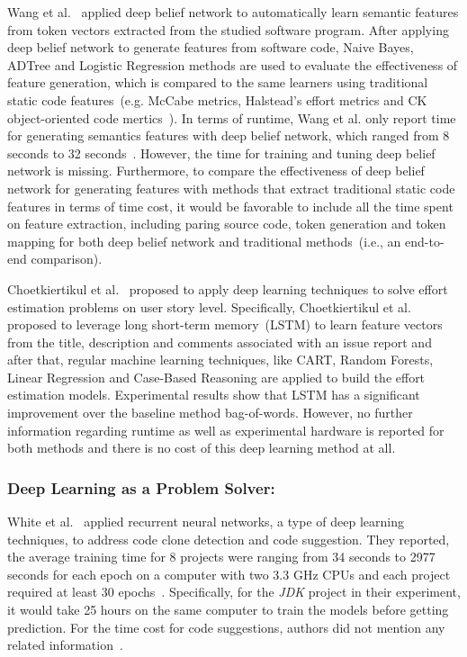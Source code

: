 \documentclass[sigconf]{acmart}
\theoremstyle{break}
\begin{document}
 Wang et al.~\cite{wang2016automatically} applied deep belief network to automatically
 learn semantic features from token vectors extracted from the studied software program. After
 applying deep belief network to generate features from software code,
 Naive Bayes, ADTree and Logistic Regression methods are used to evaluate the effectiveness
 of feature generation, which is compared to the same learners using traditional 
 static code features~(e.g.  McCabe metrics, Halstead's effort metrics and  CK object-oriented code mertics~\cite{kafura1987use,chidamber1994metrics,mccabe1976complexity,halstead1977elements}). In terms of
 runtime, Wang et al. only report time for generating semantics features with deep belief network, which
 ranged from 8 seconds to 32 seconds~\cite{wang2016automatically}. However, the time for training and tuning deep belief network is
 missing. Furthermore, to compare the effectiveness of deep belief network for generating features with methods that extract traditional 
 static code features in terms of time cost, 
 it would be favorable to include all the time spent on feature extraction, including
 paring source code, token generation and token mapping for both deep belief network and traditional methods~(i.e., an end-to-end comparison).
 
 Choetkiertikul et al.~\cite{choetkiertikul2016deep} proposed to apply deep learning techniques
 to solve effort estimation problems on user story level. 
 Specifically,  Choetkiertikul et al. ~\cite{choetkiertikul2016deep} proposed to leverage
 long short-term memory~(LSTM) to learn feature vectors from the title,
 description and comments associated with an issue report and after that,
 regular machine learning techniques, like CART, Random Forests, 
 Linear Regression and Case-Based Reasoning are applied to build the effort
 estimation models. Experimental results show that
 LSTM has a 
 significant improvement over the baseline method bag-of-words.
 However, no further information regarding
 runtime as well as experimental hardware  is reported for both methods and there is no cost 
 of this deep learning method at all.
 
 
\noindent
\subsubsection{Deep Learning as  a Problem Solver:}

 White et al.~\cite{white2015toward, white2016deep} applied
 recurrent neural networks, a type of  deep learning techniques, 
 to address code clone detection and code suggestion. They reported,
 the average training time for 8 projects were ranging from 34 seconds
  to 2977 seconds for each epoch on a computer with two 3.3 GHz
 CPUs and each project required at least 30 epochs~\cite{white2016deep}.
Specifically, for the {\it JDK} project in their experiment, it would take 25 hours 
 on the same computer to train the models before getting prediction.
 For the time cost for code suggestions, authors did not mention any related information~\cite{white2015toward}.
\end{document}
